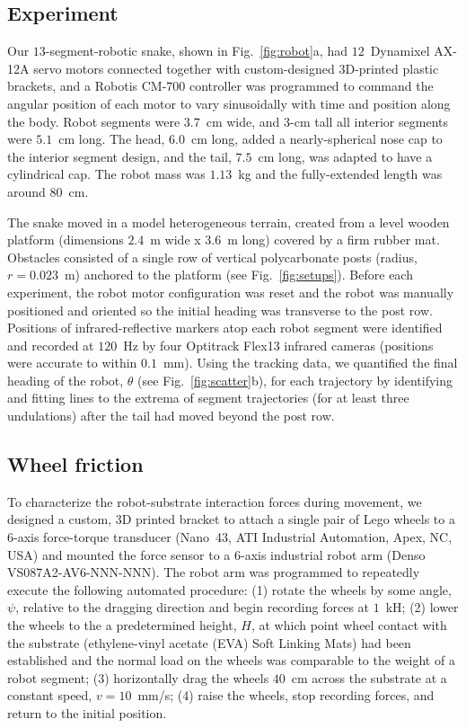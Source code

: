 \documentclass[aps,pre,twocolumn,superscriptaddress]{revtex4-1}
\begin{document}
\subsection{Experiment}

Our $13$-segment-robotic snake, shown in Fig.~\ref{fig:robot}a, had $12$~Dynamixel AX-12A servo motors connected together with custom-designed 3D-printed plastic brackets, and a Robotis CM-700 controller was programmed to command the angular position of each motor to vary sinusoidally with time and position along the body. Robot segments were  $3.7$~cm wide, and $3$-cm tall all interior segments were $5.1$~cm long. The head, $6.0$~cm long, added a nearly-spherical nose cap to the interior segment design, and the tail, $7.5$~cm long, was adapted to have a cylindrical cap. The robot mass was $1.13$~kg and the fully-extended length was around $80$~cm. 

The snake moved in a model heterogeneous terrain, created from a level wooden platform (dimensions $2.4$~m wide x $3.6$~m long) covered by a firm rubber mat. Obstacles consisted of a single row of vertical polycarbonate posts (radius, $r=0.023$~m) anchored to the platform (see Fig.~\ref{fig:setups}). Before each experiment, the robot motor configuration was reset and the robot was manually positioned and oriented so the initial heading was transverse to the post row.  Positions of infrared-reflective markers atop each robot segment were identified and recorded at $120$~Hz by four Optitrack Flex13 infrared cameras (positions were accurate to within $0.1$~mm). Using the tracking data, we quantified the final heading of the robot, $\theta$ (see Fig.~\ref{fig:scatter}b), for each trajectory by identifying and fitting lines to the extrema of segment trajectories (for at least three undulations) after the tail had moved beyond the post row.


\subsection{Wheel friction}
\label{suppmat:wheels}
To characterize the robot-substrate interaction forces during movement, we designed a custom, 3D printed bracket to attach a single pair of Lego wheels to a 6-axis force-torque transducer (Nano~43, ATI Industrial Automation, Apex, NC, USA) and mounted the force sensor to a 6-axis industrial robot arm (Denso VS087A2-AV6-NNN-NNN). The robot arm was programmed to repeatedly execute the following automated procedure: (1) rotate the wheels by some angle, $\psi$, relative to the dragging direction and begin recording forces at $1$~kH; (2) lower the wheels to the a predetermined height, $H$, at which point wheel contact with the substrate (ethylene-vinyl acetate (EVA) Soft Linking Mats) had been established and the normal load on the wheels was comparable to the weight of a robot segment; (3) horizontally drag the wheels $40$~cm across the substrate at a constant speed, $v = 10$~mm/s; (4) raise the wheels, stop recording forces, and return to the initial position. 
\end{document}
